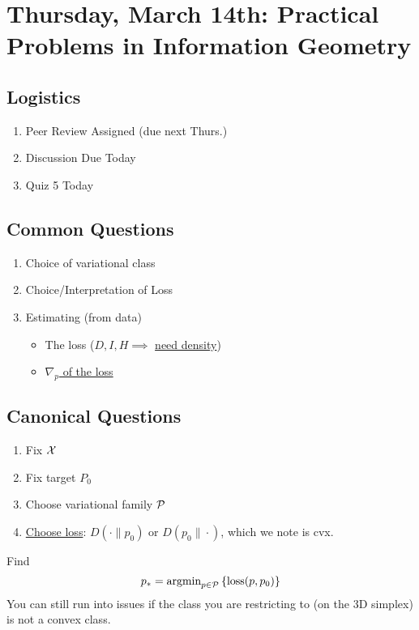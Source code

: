 \section{Thursday, March 14th: Practical Problems in Information Geometry}
\subsection{Logistics}
\begin{enumerate}
    \item Peer Review Assigned (due next Thurs.)
    \item Discussion Due Today
    \item Quiz 5 Today
\end{enumerate}

\subsection{Common Questions}
\begin{enumerate}
    \item Choice of variational class
    \item Choice/Interpretation of Loss
    \item Estimating (from data)
    \begin{itemize}
        \item The loss ($D, I, H\implies$ \underline{need density})
        \item \underline{$\nabla_p$ of the loss}
    \end{itemize}
\end{enumerate}

\subsection{Canonical Questions}
\begin{enumerate}
    \item Fix $\mathcal{X}$
    \item Fix target $P_0$
    \item Choose variational family $\mathcal{P}$
    \item \underline{Choose loss}: $D(\cdot\| p_0)$ or $D(p_0\|\cdot)$, which we note is cvx.
\end{enumerate}
Find \begin{equation}
    p_\ast = \textnormal{argmin}_{p\in\mathcal{P}} 
    \left\{\text{loss}(p, p_0)\right\}
\end{equation}
You can still run into issues if the class you are restricting to (on the 3D simplex) is not a convex class.


